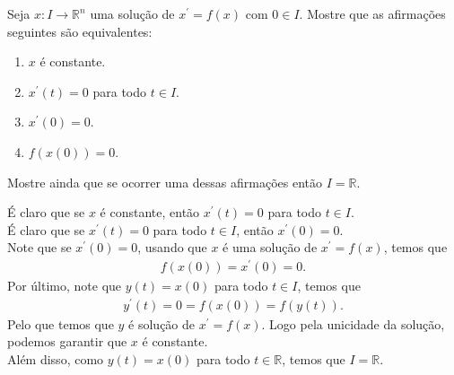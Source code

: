 \begin{homeworkProblem}[1-6]
  Seja $x : I \to \mathbb{R}^n$ uma solução de $x^{\prime}= f(x)$  com $0 \in I$. Mostre que as afirmações seguintes são equivalentes:
  \begin{enumerate}
    \item $x$ é constante.
    \item $x^{\prime}(t) = 0$ para todo $t \in I$.
    \item $x^{\prime}(0) = 0$.
    \item $f(x(0)) = 0$.
  \end{enumerate}
  Mostre ainda que se ocorrer uma dessas afirmações então $I=\mathbb{R}$.
  \begin{solution}
    É claro que se $x$ é constante, então $x^{\prime}(t)=0$ para todo $t\in I$.\\
    É claro que se $x^{\prime}(t)=0$ para todo $t\in I$, então $x^{\prime}(0)=0$.\\
    Note que se $x^{\prime}(0)=0$, usando que $x$ é uma solução de $x^{\prime}=f(x)$, temos que
    \begin{align*}
      f(x(0))=x^{\prime}(0)=0.
    \end{align*}
    Por último, note que $y(t)=x(0)$ para todo $t\in I$, temos que
    \begin{align*}
      y^{\prime}(t)=0=f(x(0))=f(y(t)).
    \end{align*}
    Pelo que temos que $y$ é solução de $x^{\prime}=f(x)$. Logo pela unicidade da solução, podemos garantir que $x$ é constante.\\
    Além disso, como $y(t)=x(0)$ para todo $t\in\mathbb{R}$, temos que $I=\mathbb{R}$.
  \end{solution}
\end{homeworkProblem}
